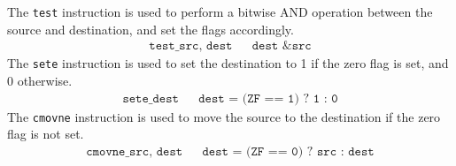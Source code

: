   \begin{definition}
    The \texttt{test} instruction is used to perform a bitwise AND operation between the source and destination, and set the flags accordingly. 
    \begin{align*}
      \texttt{test\_ src, dest} && \texttt{dest \& src} 
    \end{align*}
    The \texttt{sete} instruction is used to set the destination to 1 if the zero flag is set, and 0 otherwise. 
    \begin{align*}
      \texttt{sete\_ dest} && \texttt{dest = (ZF == 1) ? 1 : 0} 
    \end{align*}
    The \texttt{cmovne} instruction is used to move the source to the destination if the zero flag is not set. 
    \begin{align*}
      \texttt{cmovne\_ src, dest} && \texttt{dest = (ZF == 0) ? src : dest} 
    \end{align*}
  \end{definition}


